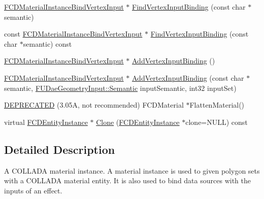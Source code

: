 \begin{DoxyCompactItemize}
\hyperlink{classFCDMaterialInstanceBindVertexInput}{FCDMaterialInstanceBindVertexInput} $\ast$ \hyperlink{classFCDMaterialInstance_a5081cea89492e19506ac31ae9d01fcf0}{FindVertexInputBinding} (const char $\ast$semantic)
\item 
const \hyperlink{classFCDMaterialInstanceBindVertexInput}{FCDMaterialInstanceBindVertexInput} $\ast$ \hyperlink{classFCDMaterialInstance_a32cb9141f1becbc35212537e18e9ab42}{FindVertexInputBinding} (const char $\ast$semantic) const 
\item 
\hyperlink{classFCDMaterialInstanceBindVertexInput}{FCDMaterialInstanceBindVertexInput} $\ast$ \hyperlink{classFCDMaterialInstance_a91776fc1c3d21da97183a6b066056cc3}{AddVertexInputBinding} ()
\item 
\hyperlink{classFCDMaterialInstanceBindVertexInput}{FCDMaterialInstanceBindVertexInput} $\ast$ \hyperlink{classFCDMaterialInstance_a96bb0dc2620bf91c873bc44371d7aa74}{AddVertexInputBinding} (const char $\ast$semantic, \hyperlink{namespaceFUDaeGeometryInput_a0f887d29f54b10338ebcf73789a7a061}{FUDaeGeometryInput::Semantic} inputSemantic, int32 inputSet)
\item 
\hyperlink{classFCDMaterialInstance_aa0f7bd7b6f5e4e7f20c40fedbe0022b0}{DEPRECATED} (3.05A, not recommended) FCDMaterial $\ast$FlattenMaterial()
\item 
virtual \hyperlink{classFCDEntityInstance}{FCDEntityInstance} $\ast$ \hyperlink{classFCDMaterialInstance_afcf47870beed21fcce66de36b57ba216}{Clone} (\hyperlink{classFCDEntityInstance}{FCDEntityInstance} $\ast$clone=NULL) const 
\end{DoxyCompactItemize}


\subsection{Detailed Description}
A COLLADA material instance. A material instance is used to given polygon sets with a COLLADA material entity. It is also used to bind data sources with the inputs of an effect. 

